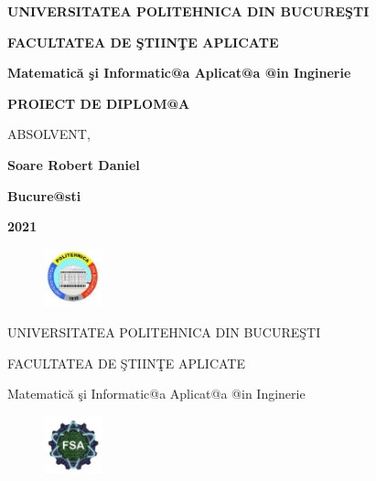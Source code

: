 \documentclass[11pt,twoside]{book}
\begin{document}
\thispagestyle{empty}

\centerline{\bf UNIVERSITATEA POLITEHNICA DIN BUCURE\c STI}

\vspace{0.5cm}

\centerline{\bf FACULTATEA DE \c STIIN\c TE APLICATE}

\vspace{0.5cm}

\centerline{\bf Matematic\u a \c si Informatic@a Aplicat@a @in
Inginerie}

\vspace{5cm}

\centerline{\Huge\bf PROIECT DE DIPLOM@A}

\vspace{6cm}

 \hfill {ABSOLVENT,}

 \hfill{\bf Soare Robert Daniel}


\vspace{3cm}

\centerline{\bf Bucure@sti}

\vspace{0.5cm}

\centerline{\bf 2021}
\newpage
\thispagestyle{empty}

\newpage
\thispagestyle{empty}

\begin{figure}
\vspace{-3.4cm}
\begin{center}
 \includegraphics[width=0.15\textwidth]{sigla-Poli.eps}
\end{center}
\end{figure}

\newpage
\thispagestyle{empty}

\centerline{UNIVERSITATEA POLITEHNICA DIN BUCURE\c STI}

\centerline{FACULTATEA DE \c STIIN\c TE APLICATE}

\centerline{Matematic\u a \c si Informatic@a Aplicat@a @in
Inginerie}

\begin{figure}
\vspace{-4.7cm}
\begin{center}
  \includegraphics[width=0.15\textwidth]{sigla-Poli-FSA.eps}
\end{center}
\end{figure}
\end{document}

